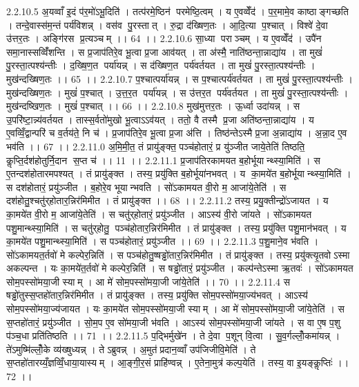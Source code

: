 2.2.10.5
अ॒यव्वाँ इ॒दं प॑र॒मो॑ऽभू॒दिति॑ । तत्प॑रमे॒ष्ठिन॑ परमेष्ठि॒त्वम् । य ए॒वव्वेँद॑ । प॒र॒मामे॒व काष्ठाङ्गच्छति । तन्दे॒वास्स॑म॒न्तं पर्य॑विशन्न् । वस॑व पु॒रस्तात् । रु॒द्रा द॑ख्षिण॒तः । आ॒दि॒त्या प॒श्चात् । विश्वे॑ दे॒वा उ॑त्तर॒तः । अङ्गि॑रस प्र॒त्यञ्चम् ।। 64 ।।
2.2.10.6
सा॒ध्या पराञ्चम् । य ए॒वव्वेँद॑ । उपै॑न समा॒नास्सव्विँ॑शन्ति । स प्र॒जाप॑तिरे॒व भू॒त्वा प्र॒जा आव॑यत् । ता अ॑स्मै॒ नाति॑ष्ठन्ता॒न्नाद्या॑य । ता मुखं॑ पु॒रस्ता॒त्पश्य॑न्तीः । द॒ख्षि॒ण॒त पर्या॑यन्न् । स द॑ख्षिण॒त पर्य॑वर्तयत । ता मुखं॑ पु॒रस्ता॒त्पश्य॑न्तीः । मुख॑न्दख्षिण॒तः ।। 65 ।।
2.2.10.7
प॒श्चात्पर्या॑यन्न् । स प॒श्चात्पर्य॑वर्तयत । ता मुखं॑ पु॒रस्ता॒त्पश्य॑न्तीः । मुख॑न्दख्षिण॒तः । मुखं॑ प॒श्चात् । उ॒त्त॒र॒त पर्या॑यन्न् । स उ॑त्तर॒त पर्य॑वर्तयत । ता मुखं॑ पु॒रस्ता॒त्पश्य॑न्तीः । मुख॑न्दष्खिण॒तः । मुखं॑ प॒श्चात् ।। 66 ।।
2.2.10.8
मुख॑मुत्तर॒तः । ऊ॒र्ध्वा उदा॑यन्न् । स उ॒परि॑ष्टा॒न्न्य॑वर्तयत । तास्स॒र्वतो॑मुखो भू॒त्वाऽऽव॑यत् । ततो॒ वै तस्मै प्र॒जा अति॑ष्ठन्ता॒न्नाद्या॑य । य ए॒वव्विँ॒द्वान्परि॑ च व॒र्तय॑ते॒ नि च॑ । प्र॒जाप॑तिरे॒व भू॒त्वा प्र॒जा अ॑त्ति । तिष्ठ॑न्तेऽस्मै प्र॒जा अ॒न्नाद्या॑य । अ॒न्ना॒द ए॒व भव॑ति ।। 67 ।।
2.2.11.0
अ॒मि॒मी॒त॒ तं प्रायु॑ङ्क्त॒ पञ्च॑होतारं॒ प्र यु॑ञ्जीत जाये॒तेति॑ तिष्ठति॒ कॢप्ति॒र्दश॑होतुर्नि॒दान॑ स॒प्त च॑ ।। 11 ।।
2.2.11.1
प्र॒जाप॑तिरकामयत ब॒होर्भूयान्थ्स्या॒मिति॑ । स ए॒तन्दश॑होतारमपश्यत् । तं प्रायु॑ङ्क्त । तस्य॒ प्रयु॑क्ति ब॒होर्भूया॑नभवत् । य का॒मये॑त ब॒होर्भूयान्थ्स्या॒मिति॑ । स दश॑होतारं॒ प्रयु॑ञ्जीत । ब॒होरे॒व भूयान्भवति । सो॑ऽकामयत वी॒रो म॒ आजा॑ये॒तेति॑ । स दश॑होतु॒श्चतु॑र्‌होतार॒न्निर॑मिमीत । तं प्रायु॑ङ्क्त ।। 68 ।।
2.2.11.2
तस्य॒ प्रयु॒क्तीन्द्रो॑ऽजायत । य का॒मये॑त वी॒रो म॒ आजा॑ये॒तेति॑ । स चतु॑र्‌होतारं॒ प्रयु॑ञ्जीत । आऽस्य॑ वी॒रो जा॑यते । सो॑ऽकामयत पशु॒मान्थ्स्या॒मिति॑ । स चतु॑र्‌होतु॒ पञ्च॑होतार॒न्निर॑मिमीत । तं प्रायु॑ङ्क्त । तस्य॒ प्रयु॑क्ति पशु॒मान॑भवत् । य का॒मये॑त पशु॒मान्थ्स्या॒मिति॑ । स पञ्च॑होतारं॒ प्रयु॑ञ्जीत ।। 69 ।।
2.2.11.3
प॒शु॒माने॒व भ॑वति । सो॑ऽकामयत॒र्तवो॑ मे कल्पेर॒न्निति॑ । स पञ्च॑होतु॒ष्षड्ढो॑तार॒न्निर॑मिमीत । तं प्रायु॑ङ्क्त । तस्य॒ प्रयु॑क्त्यृ॒तवोऽस्मा अकल्पन्त । यः का॒मये॑त॒र्तवो॑ मे कल्पेर॒न्निति॑ । स षड्ढो॑तारं॒ प्रयु॑ञ्जीत । कल्प॑न्तेऽस्मा ऋ॒तवः॑ । सो॑ऽकामयत सोम॒पस्सो॑मया॒जी स्याम् । आ मे॑ सोम॒पस्सो॑मया॒जी जा॑ये॒तेति॑ ।। 70 ।।
2.2.11.4
स षड्ढो॑तुस्स॒प्तहो॑तार॒न्निर॑मिमीत । तं प्रायु॑ङ्क्त । तस्य॒ प्रयु॑क्ति सोम॒पस्सो॑मया॒ज्य॑भवत् । आऽस्य॑ सोम॒पस्सो॑मया॒ज्य॑जायत । यः का॒मये॑त सोम॒पस्सो॑मया॒जी स्याम् । आ मे॑ सोम॒पस्सो॑मया॒जी जा॑ये॒तेति॑ । स स॒प्तहो॑तारं॒ प्रयु॑ञ्जीत । सो॒म॒प ए॒व सो॑मया॒जी भ॑वति । आऽस्य॑ सोम॒पस्सो॑मया॒जी जा॑यते । स वा ए॒ष प॒शु प॑ञ्च॒धा प्रति॑तिष्ठति ।। 71 ।।
2.2.11.5
प॒द्भिर्मुखे॑न । ते दे॒वा प॒शून् वि॒त्वा । सु॒व॒र्गल्लोँ॒कमा॑यन्न् । ते॑ऽमुष्मि॑ल्लोँ॒के व्य॑ख्षुध्यन्न् । तेऽब्रुवन्न् । अ॒मुत॑प्रदान॒व्वाँ उप॑जिजीवि॒मेति॑ । ते स॒प्तहो॑तारय्यँ॒ज्ञव्विँ॒धाया॒यास्यम् । आ॒ङ्गी॒र॒सं प्राहि॑ण्वन्न् । ए॒तेना॒मुत्र॑ कल्प॒येति॑ । तस्य॒ वा इ॒यङ्कॢप्तिः॑ ।। 72 ।।
